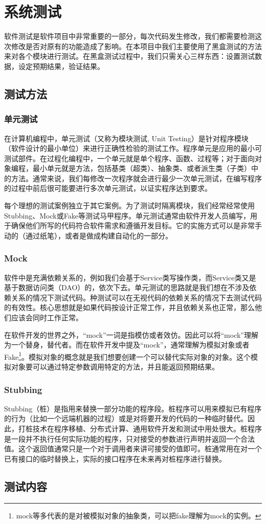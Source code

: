 
\chapter{系统测试}
软件测试是软件项目中非常重要的一部分，每次代码发生修改，我们都需要检测这次修改是否对原有的功能造成了影响。在本项目中我们主要使用了黑盒测试的方法来对各个模块进行测试。在黑盒测试过程中，我们只需关心三样东西：设置测试数据，设定预期结果，验证结果。

\section{测试方法}
\subsection{单元测试}
在计算机编程中，单元测试（又称为模块测试, Unit Testing）是针对程序模块（软件设计的最小单位）来进行正确性检验的测试工作。程序单元是应用的最小可测试部件。在过程化编程中，一个单元就是单个程序、函数、过程等；对于面向对象编程，最小单元就是方法，包括基类（超类）、抽象类、或者派生类（子类）中的方法。通常来说，我们每修改一次程序就会进行最少一次单元测试，在编写程序的过程中前后很可能要进行多次单元测试，以证实程序达到要求。

每个理想的测试案例独立于其它案例。为了测试时隔离模块，我们经常经常使用Stubbing、Mock或Fake等测试马甲程序。单元测试通常由软件开发人员编写，用于确保他们所写的代码符合软件需求和遵循开发目标。它的实施方式可以是非常手动的（通过纸笔），或者是做成构建自动化的一部分。

\subsection{Mock}
软件中是充满依赖关系的，例如我们会基于Service类写操作类，而Service类又是基于数据访问类（DAO）的，依次下去。单元测试的思路就是我们想在不涉及依赖关系的情况下测试代码。种测试可以在无视代码的依赖关系的情况下去测试代码的有效性。核心思想就是如果代码按设计正常工作，并且依赖关系也正常，那么他们应该会同时工作正常。

在软件开发的世界之外，``mock''一词是指模仿或者效仿。因此可以将``mock''理解为一个替身，替代者。而在软件开发中提及``mock''，通常理解为模拟对象或者Fake\footnote{mock等多代表的是对被模拟对象的抽象类，可以把fake理解为mock的实例。}。模拟对象的概念就是我们想要创建一个可以替代实际对象的对象。这个模拟对象要可以通过特定参数调用特定的方法，并且能返回预期结果。

\subsection{Stubbing}
Stubbing（桩）是指用来替换一部分功能的程序段。桩程序可以用来模拟已有程序的行为（比如一个远端机器的过程）或是对将要开发的代码的一种临时替代。因此，打桩技术在程序移植、分布式计算、通用软件开发和测试中用处很大。桩程序是一段并不执行任何实际功能的程序，只对接受的参数进行声明并返回一个合法值。这个返回值通常只是一个对于调用者来讲可接受的值即可。桩通常用在对一个已有接口的临时替换上，实际的接口程序在未来再对桩程序进行替换。

\section{测试内容}
